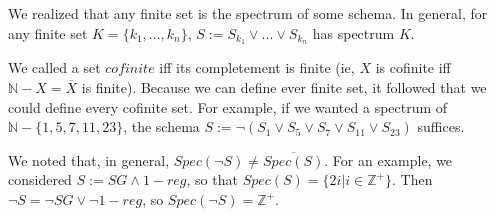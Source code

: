 \begin{mdframed}[linewidth=1]
We realized that any finite set is the spectrum of some schema. In general, for any finite set $K = \{k_1,...,k_n\}$, $S := S_{k_1} \vee ... \vee S_{k_n}$ has spectrum $K$. 

We called a set $cofinite$ iff its completement is finite (ie, $X$ is cofinite iff $\mathbb{N} - X = \overline{X}$ is finite). Because we can define ever finite set, it followed that we could define every cofinite set. For example, if we wanted a spectrum of $\mathbb{N} - \{1, 5, 7, 11, 23\}$, the schema $S := \lnot(S_1 \vee S_5 \vee S_7 \vee S_{11} \vee S_{23})$ suffices. 

We noted that, in general, $Spec(\lnot S) \neq \overline{Spec(S)}$. For an example, we considered $S := SG \land 1-reg$, so that $Spec(S) = \{2i | i \in \mathbb{Z}^+\}$. Then $\lnot S = \lnot SG \vee \lnot 1-reg$, so $Spec(\lnot S) = \mathbb{Z}^+$. 


\end{mdframed}



